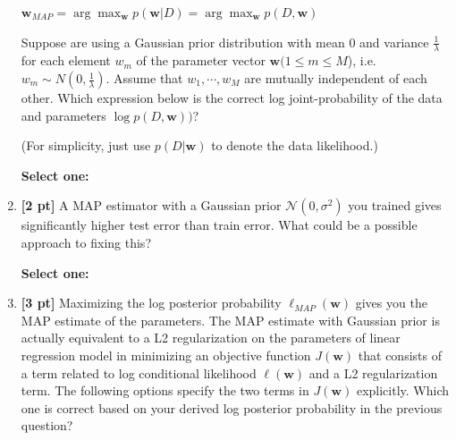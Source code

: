\documentclass{article}
\renewcommand{\circle}{\tikz\draw[black] (0,0) circle (1ex);}
\begin{document}
\begin{enumerate}
    $\mathbf{w}_{MAP} = \arg\max_{\mathbf{w}} p(\mathbf{w} | D) = \arg\max_{\mathbf{w}} p(D, \mathbf{w})$

    Suppose are using a Gaussian prior distribution with mean 0 and variance $\frac{1}{\lambda}$ for each element $w_m$  of the parameter vector $\mathbf{w} (1 \leq m \leq M $), i.e. $w_m \sim N(0, \frac{1}{\lambda})$. Assume that $w_1, \cdots, w_M$ are mutually independent of each other. Which expression below is the correct log joint-probability of the data and parameters $\log p(D, \mathbf{w}))$? 

    (For simplicity, just use $p(D|\mathbf{w})$ to denote the data likelihood.)

    \textbf{Select one:}
    
    \item \textbf{[2 pt]} A MAP estimator with a Gaussian prior $\mathcal{N}(0, \sigma^2)$ you trained gives significantly higher test error than train error. What could be a possible approach to fixing this? 

    \textbf{Select one:}
    
    \item \textbf{[3 pt]} Maximizing the log posterior probability  $\ell_{\textit{MAP}}(\mathbf{w})$ gives you the MAP estimate of the parameters. The MAP estimate with Gaussian prior is actually equivalent to a L2 regularization on the parameters of linear regression model in minimizing an objective function $J(\mathbf{w})$ that consists of a term related to log conditional likelihood $\ell(\mathbf{w})$ and a L2 regularization term. The following options specify the two terms in $J(\mathbf{w})$ explicitly. Which one is correct based on your derived log posterior probability in the previous question? 


\end{enumerate}
\end{document}
